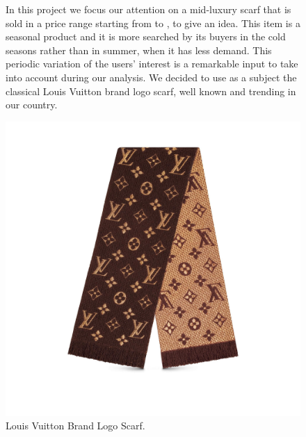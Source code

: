 \begin{figure}[!htp] 
	\begin{flushleft}
		In this project we focus our attention on a mid-luxury scarf that is sold in a price range starting from  to , to give an idea. This item is a seasonal product and it is more searched by its buyers in the cold seasons rather than in summer, when it has less demand. This periodic variation of the users' interest is a remarkable input to take into account during our analysis. We decided to use as a subject the classical Louis Vuitton brand logo scarf, well known and trending in our country.
	\end{flushleft}
	\centering
	\includegraphics[width=0.8\linewidth]{sections/images/productLogo}
	\caption{Louis Vuitton Brand Logo Scarf.}
\end{figure}
\clearpage